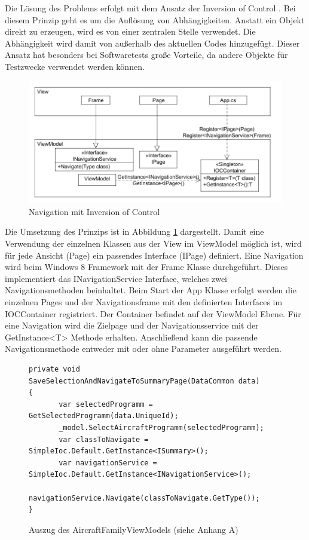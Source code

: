 Die Lösung des Problems erfolgt mit dem Ansatz der Inversion of Control \cite{bib:ioc}. Bei diesem Prinzip geht es um die Auflösung von Abhängigkeiten. Anstatt ein Objekt direkt zu erzeugen, wird es von einer zentralen Stelle verwendet. Die Abhängigkeit wird damit von außerhalb des aktuellen Codes hinzugefügt. Dieser Ansatz hat besonders bei Softwaretests große Vorteile, da andere Objekte für Testzwecke verwendet werden können.  \par
\begin{figure}[H]
\centering
\includegraphics[width=\hsize]{images/dependencyInjection}
\caption{Navigation mit Inversion of Control}
\label{ioc}
\end{figure}
Die Umsetzung des Prinzips ist in Abbildung \ref{ioc} dargestellt. Damit eine Verwendung der einzelnen Klassen aus der View im ViewModel möglich ist, wird für jede Ansicht (Page) ein passendes Interface (IPage) definiert. Eine Navigation wird beim Windows 8 Framework mit der Frame Klasse durchgeführt. Dieses implementiert das INavigationService Interface, welches zwei Navigationsmethoden beinhaltet. Beim Start der App Klasse erfolgt werden die einzelnen Pages und der Navigationsframe mit den definierten Interfaces im IOCContainer registriert. Der Container befindet auf der ViewModel Ebene. Für eine Navigation wird die Zielpage und der Navigationsservice mit der GetInstance<T> Methode erhalten. Anschließend kann die passende Navigationsmethode entweder mit oder ohne Parameter ausgeführt werden. \par 
\begin{figure}[H]
\begin{lstlisting}
private void SaveSelectionAndNavigateToSummaryPage(DataCommon data)
{
       var selectedProgramm = GetSelectedProgramm(data.UniqueId);
       _model.SelectAircraftProgramm(selectedProgramm);
       var classToNavigate = SimpleIoc.Default.GetInstance<ISummary>();
       var navigationService = SimpleIoc.Default.GetInstance<INavigationService>();
       navigationService.Navigate(classToNavigate.GetType());
}
\end{lstlisting}
\caption{Auszug des AircraftFamilyViewModels (siehe Anhang A)}
\label{navigateMethod}
\end{figure}

